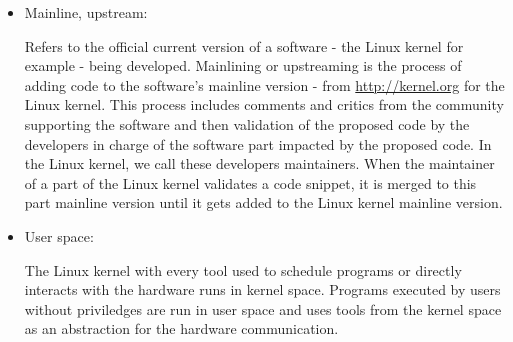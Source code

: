 \begin{itemize}
\item Mainline, upstream:

Refers to the official current version of a software - the Linux kernel for example - being developed. Mainlining or upstreaming is the process of adding code to the software's mainline version - from \url{http://kernel.org} for the Linux kernel. This process includes comments and critics from the community supporting the software and then validation of the proposed code by the developers in charge of the software part impacted by the proposed code. In the Linux kernel, we call these developers maintainers. When the maintainer of a part of the Linux kernel validates a code snippet, it is merged to this part mainline version until it gets added to the Linux kernel mainline version.

\item User space:

The Linux kernel with every tool used to schedule programs or directly interacts with the hardware runs in kernel space. Programs executed by users without priviledges are run in user space and uses tools from the kernel space as an abstraction for the hardware communication.

\end{itemize}
